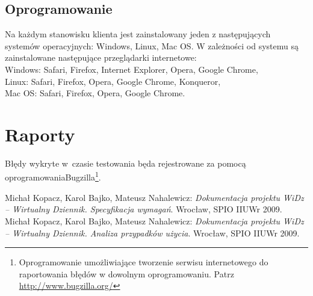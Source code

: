\documentclass[12pt,leqno,twoside]{mwart}
\begin{document}
\subsection{Oprogramowanie}
\noindent Na każdym stanowisku klienta jest zainstalowany jeden z następujących systemów operacyjnych: Windows, Linux, Mac OS. W zależności od systemu są zainstalowane następujące przeglądarki internetowe: \\
	\indent Windows: Safari, Firefox, Internet Explorer, Opera, Google Chrome, \\
	\indent Linux: Safari, Firefox, Opera, Google Chrome, Konqueror,\\
	\indent Mac OS: Safari, Firefox, Opera, Google Chrome. \
\section{Raporty}
\noindent Błędy wykryte w~czasie testowania będa rejestrowane za pomocą oprogramowania\linebreak Bugzilla\footnote{Oprogramowanie umożliwiające tworzenie serwisu internetowego do raportowania błędów w dowolnym oprogramowaniu. Patrz \url{http://www.bugzilla.org/}}. \\
\begin{thebibliography}{9}
	 Michał Kopacz, Karol Bajko, Mateusz Nahalewicz: {\it Dokumentacja projektu WiDz -- Wirtualny Dziennik. Specyfikacja wymagań}. Wrocław, SPIO IIUWr 2009.
	\bibitem{PU} Michał Kopacz, Karol Bajko, Mateusz Nahalewicz: {\it Dokumentacja projektu WiDz -- Wirtualny Dziennik. Analiza przypadków użycia}. Wrocław, SPIO IIUWr 2009.
\end{thebibliography}
\end{document}
